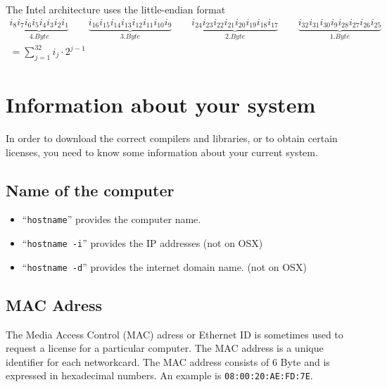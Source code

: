 \documentclass[a4paper,10pt]{report}
\newcommand{\mytt}[1]{{\tt #1}}
\begin{document}
The Intel architecture uses the little-endian format
\begin{eqnarray}
\underbrace{i_{8}i_{7}i_{6}i_{5}i_{4}i_{3}i_{2}i_{1}}_{4. Byte}
\qquad
\underbrace{i_{16}i_{15}i_{14}i_{13}i_{12}i_{11}i_{10}i_{9}}_{3. Byte}
\qquad
\underbrace{i_{24}i_{23}i_{22}i_{21}i_{20}i_{19}i_{18}i_{17}}_{2. Byte}
\qquad
\underbrace{i_{32}i_{31}i_{30}i_{9}i_{28}i_{27}i_{26}i_{25}}_{1.Byte}
\\
=\sum_{j=1}^{32} i_j\cdot 2^{j-1}
\end{eqnarray}

\section{Information about your system}
In order to download the correct compilers and libraries, or to obtain
certain licenses, you need to know some information about your current
system.

\subsection{Name of the computer}
\begin{itemize}
\item  ``\mytt{hostname}'' provides the computer name.
\item  ``\mytt{hostname -i}'' provides the IP addresses (not on OSX)
\item  ``\mytt{hostname -d}'' provides the internet domain name. (not on OSX)
\end{itemize}

\subsection{MAC Adress}
The Media Access Control (MAC) adress or Ethernet ID is sometimes used
to request a license for a particular computer. The MAC address is a
unique identifier for each networkcard. The MAC address consists of 6
Byte and is expressed in hexadecimal numbers.  An example is
\mytt{08:00:20:AE:FD:7E}.
\end{document}
